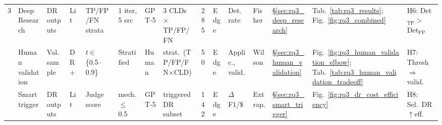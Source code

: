 \begin{landscape}
\begin{table}[H]
{\begin{tabular}{@{}l l l l l l l l c l l l l l l@{}}
\midrule
\multirow{3}{*}{3}
  & Deep Research & DR outputs & Lit & TP/FP/FN strata & 1 iter, 5 src & GPT-5 & 3 CLDs $\times$ TP/FP/FN & 285 & Edge & Det.\ rate & Fisher & \S\ref{sec:rq3_deep_research} & Tab.~\ref{tab:rq3_results}; Fig.~\ref{fig:rq3_combined} & H6: Det$_{\text{TP}}$$>$Det$_{\text{FP}}$ \\
  & Human validation & Val.\ sample & DR+ & $t\in$\{0.5--0.9\} & Stratified & Human & strat.\ (TP/FP/FN$\times$CLD) & 50 & Edge & Applic., valid. & Wilson & \S\ref{sec:rq3_human_validation} & Fig.~\ref{fig:rq3_human_validation_elbow}; Tab.~\ref{tab:rq3_human_validation_tradeoff} & H7: Thresh$\Rightarrow$valid. \\
  & Smart trigger & DR outputs & Lit & Judge score & mech. $\leq$ 0.5 & GPT-5 & triggered DR subset & 142 & Edge & $\Delta$F1/\$ & Extrap. & \S\ref{sec:rq3_smart_trigger} & Fig.~\ref{fig:rq3_dr_cost_efficiency} & H8: Sel.\ DR$\uparrow$eff. \\
\bottomrule
\end{tabular}}%


\end{table}
\end{landscape}
